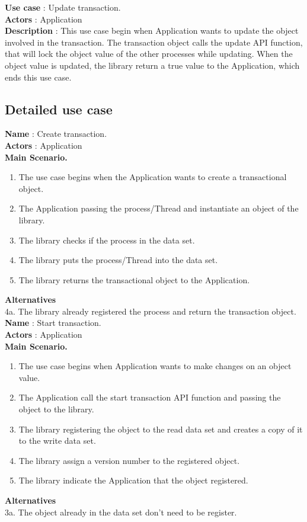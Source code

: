 \documentclass[12pt]{article}
\begin{document}
{\textbf{Use case} : Update transaction.\\
\textbf{Actors} : Application\\
\textbf{Description} : This use case begin when Application wants to update the object involved in the transaction. The transaction object calls the update API function, that will lock the object value of the other processes while updating. When the object value is updated, the library return a true value to the Application, which ends this use case.\\
}
\subsection{Detailed use case}
{\setlength{\parindent}{0cm}
\textbf{Name} : Create transaction.\\
\textbf{Actors} : Application\\
\textbf{Main Scenario.}
\begin{enumerate}
  \item The use case begins when the Application wants to create a transactional object.
  \item The Application passing the process/Thread and instantiate an object of the library.
  \item The library checks if the process in the data set.
  \item The library puts the process/Thread into the data set.
  \item The library returns the transactional object to the Application.
\end{enumerate}
\textbf{Alternatives}\\
4a. The library already registered the process and return the transaction object.\\

\textbf{Name} : Start transaction.\\
\textbf{Actors} : Application\\
\textbf{Main Scenario.}
\begin{enumerate}
  \item The use case begins when Application wants to make changes on an object value.
  \item The Application call the start transaction API function and passing the object to the library.
  \item The library registering the object to the read data set and creates  a copy of it to the write data set.
  \item The library assign a version number to the registered object.
  \item The library indicate the Application that the object registered.
\end{enumerate}
\textbf{Alternatives}\\
3a. The object already in the data set don't need to be register.\\

}
\end{document}
